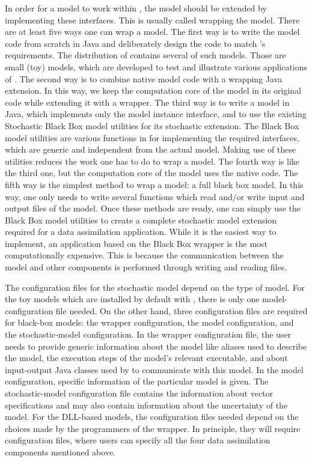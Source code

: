 In order for a model to work within \oda, the model should be extended by implementing these interfaces. This is usually called wrapping the model. There are at least five ways one can wrap a model. The first way is to write the model code from scratch in Java and deliberately design the code to match \oda's requirements. The distribution of \oda contains several of such models. Those are small (toy) models, which are developed to test and illustrate various applications of \oda. The second way is to combine native model code with a wrapping Java extension. In this way, we keep the computation core of the model in its original code while extending it with a \oda wrapper. The third way is to write a model in Java, which implements only the model instance interface, and to use the existing Stochastic Black Box model utilities for its stochastic extension. The Black Box model utilities are various functions in \oda for implementing the required interfaces, which are generic and independent from the actual model. Making use of these utilities reduces the work one has to do to wrap a model. The fourth way is like the third one, but the computation core of the model uses the native code. The fifth way is the simplest method to wrap a model: a full black box model. In this way, one only needs to write several functions which read and$/$or write input and output files of the model. Once these methods are ready, one can simply use the Black Box model utilities to create a complete stochastic model extension required for a data assimilation application. While it is the easiest way to implement, an application based on the Black Box wrapper is the most computationally expensive. This is because the communication between the model and other \oda components is performed through writing and reading files.

The configuration files for the stochastic model depend on the type of model. For the toy models which are installed by default with \oda, there is only one model-configuration file needed. On the other hand, three configuration files are required for black-box models: the wrapper configuration, the model configuration, and the stochastic-model configuration. In the wrapper configuration file, the user needs to provide generic information about the model like aliases used to describe the model, the execution steps of the model’s relevant executable, and about input-output Java classes used by \oda to communicate with this model. In the model configuration, specific information of the particular model is given. The stochastic-model configuration file contains the information about vector specifications and may also contain information about the uncertainty of the model. For the DLL-based models, the configuration files needed depend on the choices made by the programmers of the \oda wrapper. In principle, they will require configuration files, where users can specify all the four data assimilation components mentioned above. 

